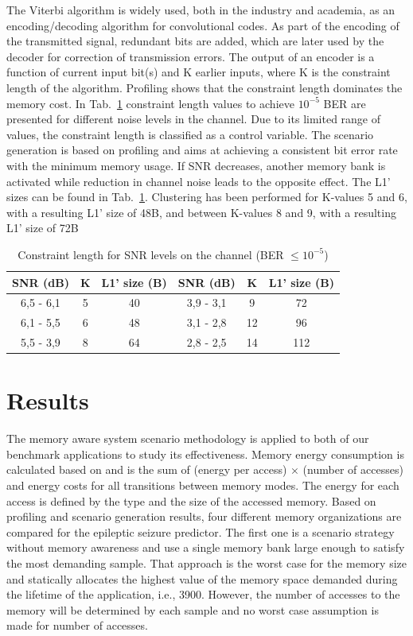 The Viterbi algorithm \cite{viterbi} is widely used, both in the industry and academia, as an encoding/decoding algorithm for convolutional codes. As part of the encoding of the transmitted signal, redundant bits are added, which are later used by the decoder for correction of transmission errors. The output of an encoder is a function of current input bit(s) and K earlier inputs, where K is the constraint length of the algorithm. Profiling shows that the constraint length dominates the memory cost.  In Tab.~\ref{tab:snr} \cite{avd} constraint length values to achieve $ 10^{-5} $ BER are presented for different noise levels in the channel. Due to its limited range of values, the constraint length is classified as a control variable. The scenario generation is based on profiling and aims at achieving a consistent bit error rate with the minimum memory usage. If SNR decreases, another memory bank is activated while reduction in channel noise leads to the opposite effect. The L1' sizes can be found in Tab.~\ref{tab:snr}. Clustering has been performed for K-values 5 and 6, with a resulting L1' size of 48B, and between K-values 8 and 9, with a resulting L1' size of 72B

\begin{table}[!t]
\caption{Constraint length for SNR levels on the channel (BER $ \leqslant 10^{-5} $)}
\label{tab:snr}
\centering
\begin{tabular}{|c|c|c|c|c|c|}
\hline 
SNR (dB) & K & L1' size (B) & SNR (dB) & K & L1' size (B) \\ 
\hline 
6,5 - 6,1 & 5 & 40 & 3,9 - 3,1 & 9 & 72 \\ 
\hline 
6,1 - 5,5 & 6 & 48 & 3,1 - 2,8 & 12 & 96 \\ 
\hline 
5,5 - 3,9 & 8 & 64 & 2,8 - 2,5 & 14 & 112 \\ 
\hline 
\end{tabular}      
\end{table}
 
\section{Results}
\label{sec:results}

The memory aware system scenario methodology is applied to both of our benchmark applications to study its effectiveness. Memory energy consumption is calculated based on \cite{Artes2011} and is the sum of (energy per access) $ \times $ (number of accesses) and energy costs for all transitions between memory modes. The energy for each access is defined by the type and the size of the accessed memory. Based on profiling and scenario generation results, four different memory organizations are compared for the epileptic seizure predictor. The first one is a scenario strategy without memory awareness and use a single memory bank large enough to satisfy the most demanding sample. That approach is the worst case for the memory size and statically allocates the highest value of the memory space demanded during the lifetime of the application, i.e., 3900. However, the number of accesses to the memory will be determined by each sample and no worst case assumption is made for number of accesses.


